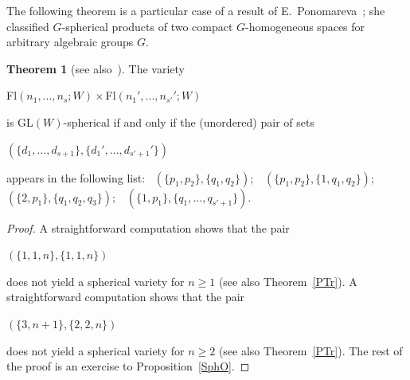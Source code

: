 \documentclass[12pt]{amsart}
\theoremstyle{definition}\newtheorem{theorem}{Theorem}[section]
\newtheorem{lemma}[proposition]{Lemma}
\theoremstyle{definition}\newtheorem{definition}[proposition]{Definition}
\theoremstyle{remark}\newtheorem{example}[proposition]{Example}
\begin{document}
The following theorem is a particular case of a result of E.~Ponomareva~\cite{Po}; she classified $G$-spherical products of two compact $G$-homogeneous spaces for arbitrary algebraic groups $G$.
\begin{theorem}[see also~\cite{Pan3}]\label{Tpon}The variety \begin{center}Fl$(n_1,..., n_s; W)\times$Fl$(n_1',...,n_{s'}'; W)$\end{center} is GL$(W)$-spherical if and only if the (unordered) pair of sets \begin{center}$(\{d_1,..., d_{s+1}\}, \{d_1',...,d_{s'+1}'\})$\end{center} appears in the following list:$\hspace{10pt}(\{p_1, p_2\}, \{q_1, q_2\});\hspace{10pt}(\{p_1, p_2\}, \{1, q_1, q_2\});$\\$(\{2, p_1\}, \{q_1, q_2, q_3\});\hspace{10pt}(\{1, p_1\}, \{q_1,..., q_{s'+1}\}).$\end{theorem}
\begin{proof}A straightforward computation shows that the pair \begin{center}$(\{1, 1, n\}, \{1, 1, n\})$\end{center} does not yield a spherical variety for $n\ge 1$ (see also Theorem~\ref{PTr}). A straightforward computation shows that the pair \begin{center}$(\{3, n+1\}, \{2, 2, n\})$\end{center} does not yield a spherical variety for $n\ge 2$ (see also Theorem~\ref{PTr}). The rest of the proof is an exercise to Proposition~\ref{SphO}. \end{proof}
\end{document}
